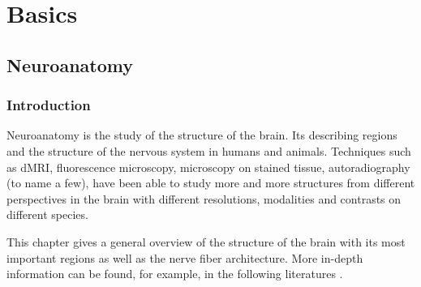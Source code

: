 \newpage\null\thispagestyle{empty}\newpage
\clearpage{\thispagestyle{empty}\cleardoublepage}
\part{Basics}
\parttoc
% 
% 
% 
\cleardoublepage
\setcounter{chapter}{1}
\chapter{Neuroanatomy}
\label{chap:neuro}
%
%
%
\section{Introduction}
%
Neuroanatomy is the study of the structure of the brain.
Its describing regions and the structure of the nervous system in humans and animals.
Techniques such as \ac{dMRI}, fluorescence microscopy, microscopy on stained tissue, autoradiography (to name a few), have been able to study more and more structures from different perspectives in the brain with different resolutions, modalities and contrasts on different species.
% 
\par
%
This chapter gives a general overview of the structure of the brain with its most important regions as well as the nerve fiber architecture.
More in-depth information can be found, for example, in the following literatures \dummy{}.
% 
%
% 
% 
% 
%
